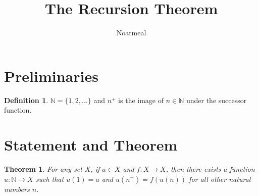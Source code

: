 \documentclass{article}
\title{The Recursion Theorem}
\author{Noatmeal}
\theoremstyle{definition}
\newtheorem{definition}{Definition}[section]
\theoremstyle{definition}
\theoremstyle{plain}
\theoremstyle{remark}
\theoremstyle{plain}
\newtheorem{theorem}{Theorem}[section]
\theoremstyle{remark}
\theoremstyle{plain}
\theoremstyle{plain}
\theoremstyle{plain}
\begin{document}
\maketitle

\section{Preliminaries}

\begin{definition}
  \( \mathbb{N} = \{1, 2, ... \} \) and \( n^{+} \) is the image of 
  \( n \in \mathbb{N} \) under the successor function.
\end{definition}

\section{Statement and Theorem}

\begin{theorem}
  For any set \( X \), if \( a \in X \) and \( f : X \rightarrow X \), then 
  there exists a function \( u: \mathbb{N} \rightarrow X \) such that 
  \( u(1) = a \) and \( u(n^{+}) = f(u(n)) \) for all other natural numbers 
  \( n \). 
  \label{recursion}
\end{theorem}
\end{document}
